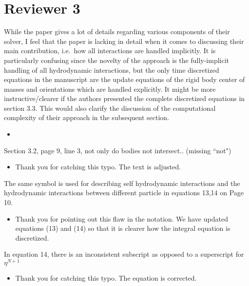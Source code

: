 \documentclass[11pt]{article}
\newcommand{\comment}[1]{{\color{blue} #1}}
\begin{document}
\section*{Reviewer 3}
\noindent
\comment{While the paper gives a lot of details regarding various
  components of their solver, I feel that the paper is lacking in detail
  when it comes to discussing their main contribution, i.e.~how all
  interactions are handled implicitly. It is particularly confusing
  since the novelty of the approach is the fully-implicit handling of
  all hydrodynamic interactions, but the only time discretized equations
  in the manuscript are the update equations of the rigid body center of
  masses and orientations which are handled explicitly. It might be more
  instructive/clearer if the authors presented the complete discretized
  equations in section 3.3. This would also clarify the discussion of
the computational complexity of their approach in the subsequent
section.}
\begin{itemize}
  \item {}
\end{itemize}

\noindent
\comment{Section 3.2, page 9, line 3, not only do bodies not intersect..
(missing ``not")}
\begin{itemize}
  \item Thank you for catching this typo.  The text is adjusted.
\end{itemize}

\noindent
\comment{The same symbol is used for describing self hydrodynamic
interactions and the hydrodynamic interactions between different
particle in equations 13,14 on Page 10.}
\begin{itemize}
  \item Thank you for pointing out this flaw in the notation.  We have
    updated equations (13) and (14) so that it is clearer how the
    integral equation is discretized.
\end{itemize}

\noindent
\comment{In equation 14, there is an inconsistent subscript as opposed
to a superscript for $\eta^{N+1}$}
\begin{itemize}
  \item Thank you for catching this typo.  The equation is corrected.
\end{itemize}
\end{document}

